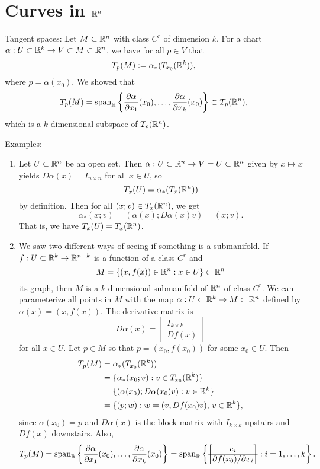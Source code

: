 \section{Curves in $\mathbb{R}^n$}\label{sec:2}

Tangent spaces: Let $M \subset \mathbb{R}^n$ with class $C^r$ of dimension $k$. For a chart 
$\alpha : U \subset \mathbb{R}^k \to V \subset M \subset \mathbb{R}^n$, we have for all $p \in V$ that 
\[ T_p(M) := \alpha_*(T_{x_0}(\mathbb{R}^k)), \] 
where $p = \alpha(x_0)$. We showed that 
\[ T_p(M) = {\rm span}_{\mathbb{R}} \left\{ \frac{\partial\alpha}{\partial x_1}(x_0), \dots, 
\frac{\partial\alpha}{\partial x_k}(x_0) \right\} \subset T_p(\mathbb{R}^n), \] 
which is a $k$-dimensional subspace of $T_p(\mathbb{R}^n)$. 

Examples: 
\begin{enumerate}[(1)]
    \item Let $U \subset \mathbb{R}^n$ be an open set. Then $\alpha : U \subset \mathbb{R}^n \to V = U \subset \mathbb{R}^n$ 
    given by $x \mapsto x$ yields $D\alpha(x) = I_{n\times n}$ for all $x \in U$, so 
    \[ T_x(U) = \alpha_*(T_x(\mathbb{R}^n)) \] 
    by definition. Then for all $(x; v) \in T_x(\mathbb{R}^n)$, we get 
    \[ \alpha_*(x; v) = (\alpha(x); D\alpha(x)v) = (x; v). \] 
    That is, we have $T_x(U) = T_x(\mathbb{R}^n)$. 

    \item We saw two different ways of seeing if something is a submanifold. If $f : U \subset \mathbb{R}^k 
    \to \mathbb{R}^{n-k}$ is a function of a class $C^r$ and 
    \[ M = \{(x, f(x)) \in \mathbb{R}^n : x \in U\} \subset \mathbb{R}^n \] 
    its graph, then $M$ is a $k$-dimensional submanifold of $\mathbb{R}^n$ of class $C^r$. We can parameterize 
    all points in $M$ with the map $\alpha : U \subset \mathbb{R}^k \to M \subset \mathbb{R}^n$ defined by 
    $\alpha(x) = (x, f(x))$. The derivative matrix is 
    \[ D\alpha(x) = \begin{bmatrix} 
        I_{k\times k} \\\hline Df(x)
    \end{bmatrix} \]
    for all $x \in U$. Let $p \in M$ so that $p = (x_0, f(x_0))$ for some $x_0 \in U$. Then 
    \begin{align*} 
        T_p(M) &= \alpha_*(T_{x_0}(\mathbb{R}^k)) \\
        &= \{\alpha_*(x_0; v) : v \in T_{x_0}(\mathbb{R}^k)\} \\
        &= \{(\alpha(x_0); D\alpha(x_0)v) : v \in \mathbb{R}^k\} \\ 
        &= \{(p; w) : w = (v, Df(x_0)v),\, v \in \mathbb{R}^k\}, 
    \end{align*} 
    since $\alpha(x_0) = p$ and $D\alpha(x)$ is the block matrix with $I_{k\times k}$ 
    upstairs and $Df(x)$ downstairs. Also, 
    \[ T_p(M) = {\rm span}_{\mathbb{R}} \left\{ \frac{\partial\alpha}{\partial x_1}(x_0), \dots, 
    \frac{\partial\alpha}{\partial x_k}(x_0) \right\} = {\rm span}_{\mathbb{R}} 
    \left\{ \begin{bmatrix} e_i \\\hline \partial f(x_0)/\partial x_i \end{bmatrix} : 
    i = 1, \dots, k \right\}. \] 


\end{enumerate}
